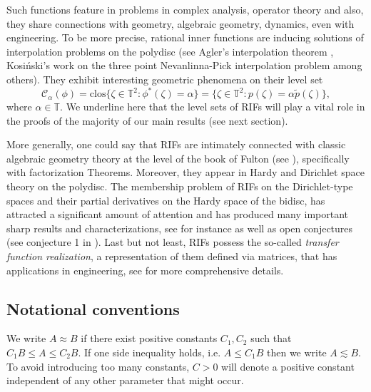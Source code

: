 \documentclass[12pt]{amsart}
\numberwithin{equation}{section}
\begin{document}
Such functions feature in problems in complex analysis, operator theory and also, they share connections with geometry, algebraic geometry, dynamics, even with engineering. To be more precise, rational inner functions are inducing solutions of interpolation problems on the polydisc (see Agler's interpolation theorem \cite{AMY, AglerInterpolation}, Kosi\'nski's work on the three point Nevanlinna-Pick interpolation problem \cite{Lukasz} among others). They exhibit interesting geometric phenomena on their level set $$\mathcal{C}_{\alpha}(\phi)=\mathrm{clos}\{\zeta\in\mathbb{T}^2:\phi^*(\zeta)=\alpha\}=\{\zeta\in\mathbb{T}^2:p(\zeta)=\alpha\widetilde{p}(\zeta)\},$$ where $\alpha\in\mathbb{T}.$ 
We underline here that the level sets of RIFs will play a vital role in the proofs of the majority of our main results (see next section).

More generally, one could say that RIFs are intimately connected with classic algebraic geometry theory at the level of the book of Fulton (see \cite{Fulton}), specifically with factorization Theorems. Moreover, they appear in Hardy and Dirichlet space theory on the polydisc. The membership problem of RIFs on the Dirichlet-type spaces and their partial derivatives on the Hardy space of the bidisc, has attracted a significant amount of attention and has produced many important sharp results and characterizations, see for instance \cite{PLMS, MeSola} as well as open conjectures (see conjecture 1 in \cite{MeSola}). Last but not least, RIFs possess the so-called \textit{transfer function realization}, a representation of them defined via matrices, that has applications in engineering, see \cite{Kumert} for more comprehensive details.

\subsection{Notational conventions} We write $A\approx B$ if there exist positive constants $C_1,C_2$ such that $C_1B\leq A\leq C_2B.$ If one side inequality holds, i.e. $A\leq C_1B$ then we write $A\lesssim B.$ To avoid introducing too many constants, $C>0$ will denote a positive constant independent of any other parameter that might occur.
\end{document}
